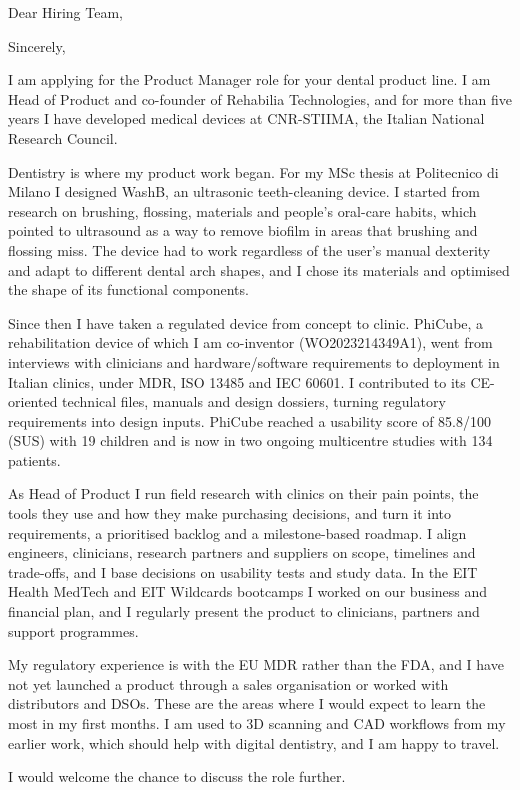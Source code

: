 \documentclass[11pt,a4paper,sans]{moderncv}
\begin{document}

\opening{Dear Hiring Team,}
\closing{Sincerely,}
\makelettertitle

I am applying for the Product Manager role for your dental product line. I am Head of Product and co-founder of Rehabilia Technologies, and for more than five years I have developed medical devices at CNR-STIIMA, the Italian National Research Council.

Dentistry is where my product work began. For my MSc thesis at Politecnico di Milano I designed WashB, an ultrasonic teeth-cleaning device. I started from research on brushing, flossing, materials and people's oral-care habits, which pointed to ultrasound as a way to remove biofilm in areas that brushing and flossing miss. The device had to work regardless of the user's manual dexterity and adapt to different dental arch shapes, and I chose its materials and optimised the shape of its functional components.

Since then I have taken a regulated device from concept to clinic. PhiCube, a rehabilitation device of which I am co-inventor (WO2023214349A1), went from interviews with clinicians and hardware/software requirements to deployment in Italian clinics, under MDR, ISO 13485 and IEC 60601. I contributed to its CE-oriented technical files, manuals and design dossiers, turning regulatory requirements into design inputs. PhiCube reached a usability score of 85.8/100 (SUS) with 19 children and is now in two ongoing multicentre studies with 134 patients.

As Head of Product I run field research with clinics on their pain points, the tools they use and how they make purchasing decisions, and turn it into requirements, a prioritised backlog and a milestone-based roadmap. I align engineers, clinicians, research partners and suppliers on scope, timelines and trade-offs, and I base decisions on usability tests and study data. In the EIT Health MedTech and EIT Wildcards bootcamps I worked on our business and financial plan, and I regularly present the product to clinicians, partners and support programmes.

My regulatory experience is with the EU MDR rather than the FDA, and I have not yet launched a product through a sales organisation or worked with distributors and DSOs. These are the areas where I would expect to learn the most in my first months. I am used to 3D scanning and CAD workflows from my earlier work, which should help with digital dentistry, and I am happy to travel.

I would welcome the chance to discuss the role further.

\makeletterclosing
\end{document}
